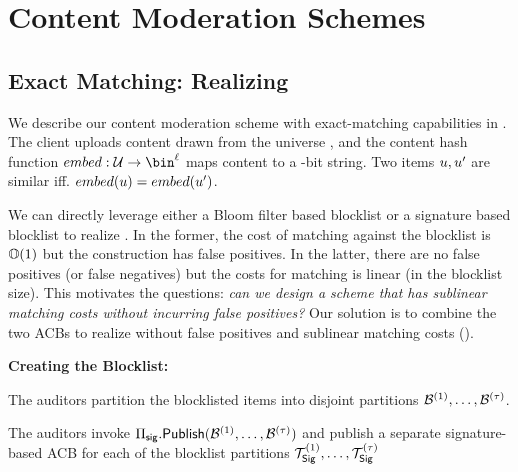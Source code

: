 \section{Content Moderation Schemes}
\label{sec:content_mod}



\subsection{Exact Matching: Realizing \contentModFuncExact}
%
We describe our content moderation scheme with exact-matching capabilities in . The client uploads content drawn from the universe \universe, and the content hash function $\contentHash: \universe \rightarrow \bin^{\genericVecLen}$ maps content to a \genericVecLen-bit string. Two items $u, u'$ are similar iff. $\contentHash(\genericUniverseElmt) = \contentHash(\genericUniverseElmtAlt)$.  


%
We can directly leverage either a Bloom filter based blocklist or a signature based blocklist to realize \contentModFuncExact. In the former, the cost of matching against the blocklist is $\mathbb{O}(1)$ but the construction has false positives. In the latter, there are no false positives (or false negatives) but the costs for matching is linear (in the blocklist size). This motivates the questions: \emph{can we design a scheme that has sublinear matching costs without incurring false positives?} Our solution is to combine the two ACBs to realize \contentModFuncExact without false positives and sublinear matching costs (). 


\noindent\textbf{Creating the Blocklist:}
\enumListStart

\item The auditors partition the blocklisted items into \numBlocklistParts disjoint partitions $\blocklistPartition{1}, \dots, \blocklistPartition{\numBlocklistParts}$. 

\item The auditors invoke $\sigACB.\publishList(\blocklistPartition{1}, \dots, \blocklistPartition{\numBlocklistParts})$ and publish a separate signature-based ACB for each of the blocklist partitions $\sigBlklistToken{1}, \dots, \sigBlklistToken{\numBlocklistParts}$ 

